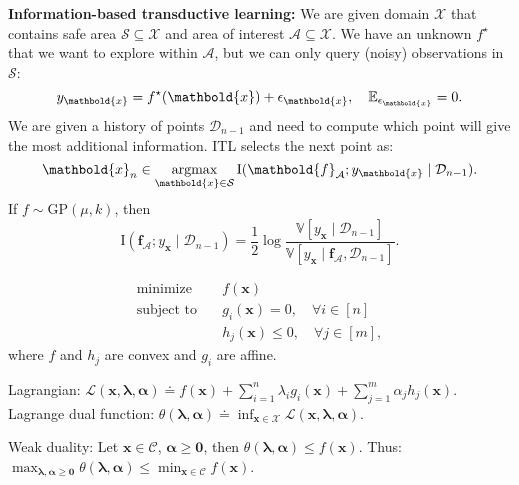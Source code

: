 \documentclass[9pt]{extarticle}
\newenvironment{topic}[1]
{\textbf{\sffamily \colorbox{black}{\rlap{\textbf{\textcolor{white}{#1}}}\hspace{\linewidth}\hspace{-2\fboxsep}}}}
{}
\newenvironment{subtopic}[1]
{\textbf{\sffamily #1:}}
{}
\renewcommand{\vec}[1]{\ensuremath{\mathbold{#1}}}
\renewcommand{\Var}{\mathbb{V}}
\begin{document}
\begin{multicols*}{3}
\begin{topic}{Uncertainty quantification}
        \begin{subtopic}{Information-based transductive learning}
            We are given domain $\mathcal{X}$ that contains safe area $\mathcal{S} \subseteq \mathcal{X}$ and
            area of interest $\mathcal{A} \subseteq \mathcal{X}$. We have an unknown $f^\star$ that we want to
            explore within $\mathcal{A}$, but we can only query (noisy) observations in $\mathcal{S}$: \[
                y_{\vec{x}} = f^\star(\vec{x}) + \epsilon_{\vec{x}}, \quad \E_{\epsilon_{\vec{x}}} = 0.
            \]
            We are given a history of points $\mathcal{D}_{n-1}$ and need to compute which point will give the
            most additional information. ITL selects the next point as: \[
                \vec{x}_n \in \argmax_{\vec{x} \in \mathcal{S}} \mathrm{I}(\vec{f}_{\mathcal{A}}; y_{\vec{x}} \mid \mathcal{D}_{n-1}).
            \]
            If $f \sim \mathrm{GP}(\mu, k)$, then \[
                \mathrm{I}(\vec{f}_{\mathcal{A}}; y_{\vec{x}} \mid \mathcal{D}_{n-1}) = \frac{1}{2} \log \frac{\Var[y_{\vec{x}} \mid \mathcal{D}_{n-1}]}{\Var[y_{\vec{x}} \mid \vec{f}_{\mathcal{A}}, \mathcal{D}_{n-1}]}.
            \]

        \end{subtopic}

    \end{topic}

    \begin{topic}{Convex optimization and SVMs}
        \begin{align*}
            \text{minimize}   & \quad f(\vec{x})                                    \\
            \text{subject to} & \quad g_i(\vec{x}) = 0, \quad \forall i \in [n]     \\
                              & \quad h_j(\vec{x}) \leq 0, \quad \forall j \in [m],
        \end{align*}
        where $f$ and $h_j$ are convex and $g_i$ are affine.

        Lagrangian: $\mathcal{L}(\vec{x}, \vec{\lambda}, \vec{\alpha}) \doteq f(\vec{x}) + \sum_{i=1}^{n}
            \lambda_i g_i(\vec{x}) + \sum_{j=1}^{m} \alpha_j h_j(\vec{x})$. Lagrange dual function:
        $\theta(\vec{\lambda}, \vec{\alpha}) \doteq \inf_{\vec{x} \in \mathcal{X}} \mathcal{L}(\vec{x},
            \vec{\lambda}, \vec{\alpha})$.

        Weak duality: Let $\vec{x} \in \mathcal{C}$, $\vec{\alpha} \geq \vec{0}$, then
        $\theta(\vec{\lambda}, \vec{\alpha}) \leq f(\vec{x})$. Thus: $\max_{\vec{\lambda}, \vec{\alpha}
                \geq \vec{0}} \theta(\vec{\lambda}, \vec{\alpha}) \leq \min_{\vec{x} \in \mathcal{C}} f(\vec{x})$.


\end{topic}
\end{multicols*}
\end{document}
